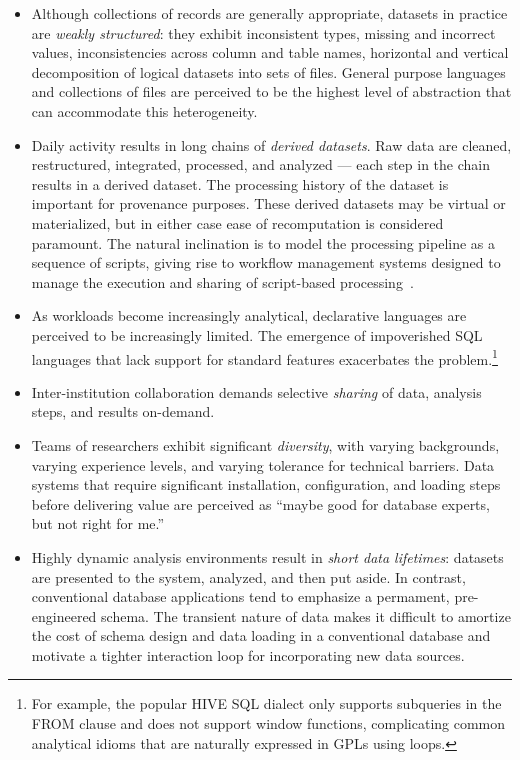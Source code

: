 \documentclass{sig-alternate}
\begin{document}
\begin{itemize}
\itemsep0em
\item 
Although collections of records are
generally appropriate, datasets in practice are \emph{weakly structured}: 
they exhibit inconsistent types, missing and incorrect values, inconsistencies across 
column and table names, horizontal and vertical decomposition of logical 
datasets into sets of files. General purpose languages and collections of
files are perceived to be the highest level of abstraction that can accommodate
this heterogeneity.

\item Daily activity results in long chains of \emph{derived datasets}.  Raw data are cleaned,
restructured, integrated, processed, and analyzed --- each step in the chain results in 
a derived dataset.  The processing history of the dataset is important for provenance
purposes.  These derived datasets may be virtual or materialized, but in either case
ease of recomputation is considered paramount.  The natural inclination is to model
the processing pipeline as a sequence of scripts, giving rise to workflow management
systems designed to manage the execution and sharing of script-based processing~\cite{cohen2011search,pegasus,ogasawara2011algebraic,escienceworkflow}.
\item As workloads become increasingly analytical, declarative languages are perceived
to be increasingly limited.  The emergence of impoverished SQL languages that lack support
for standard features exacerbates the problem.\footnote{For example, the popular HIVE SQL dialect
only supports subqueries in the FROM clause and does not support window functions, complicating 
common analytical idioms that are naturally expressed in GPLs using loops.}
\item Inter-institution collaboration demands
selective \emph{sharing} of data, analysis steps, and results on-demand.
\item Teams of researchers exhibit significant \emph{diversity}, with varying backgrounds, 
varying experience levels, and varying tolerance for technical barriers.  
Data systems that require significant installation, configuration,
and loading steps before delivering value are perceived as ``maybe good for database experts, 
but not right for me.''
\item Highly dynamic analysis environments result in \emph{short data lifetimes}: datasets are presented to the system, analyzed, and then put aside. In contrast, conventional database applications tend to emphasize 
a permament, pre-engineered schema. The transient nature of data makes it difficult to amortize the cost of schema design and data loading in a conventional database and motivate a tighter interaction loop for incorporating new data sources.
\end{itemize}
\end{document}
